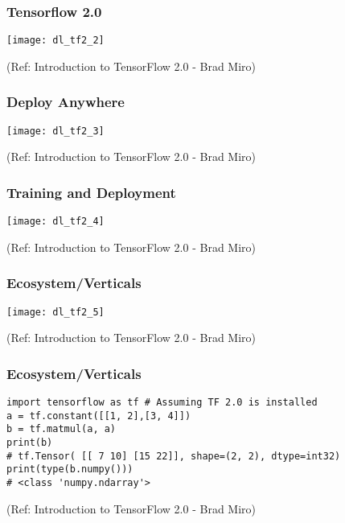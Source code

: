 \begin{frame}[fragile] \frametitle{Tensorflow 2.0}

\begin{center}
\texttt{[image: dl\_tf2\_2]}
\end{center}


\tiny{(Ref: Introduction to TensorFlow 2.0 - Brad Miro)}
\end{frame}

\begin{frame}[fragile] \frametitle{Deploy Anywhere}

\begin{center}
\texttt{[image: dl\_tf2\_3]}
\end{center}


\tiny{(Ref: Introduction to TensorFlow 2.0 - Brad Miro)}
\end{frame}

\begin{frame}[fragile] \frametitle{Training and Deployment}

\begin{center}
\texttt{[image: dl\_tf2\_4]}
\end{center}


\tiny{(Ref: Introduction to TensorFlow 2.0 - Brad Miro)}
\end{frame}

\begin{frame}[fragile] \frametitle{Ecosystem/Verticals}

\begin{center}
\texttt{[image: dl\_tf2\_5]}
\end{center}


\tiny{(Ref: Introduction to TensorFlow 2.0 - Brad Miro)}
\end{frame}

\begin{frame}[fragile] \frametitle{Ecosystem/Verticals}

\begin{lstlisting}
import tensorflow as tf # Assuming TF 2.0 is installed
a = tf.constant([[1, 2],[3, 4]])
b = tf.matmul(a, a)
print(b) 
# tf.Tensor( [[ 7 10] [15 22]], shape=(2, 2), dtype=int32)
print(type(b.numpy()))
# <class 'numpy.ndarray'>
\end{lstlisting}


\tiny{(Ref: Introduction to TensorFlow 2.0 - Brad Miro)}
\end{frame}

